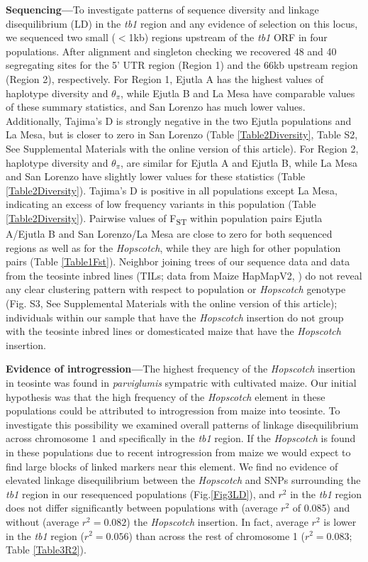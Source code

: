 \documentclass[11pt]{article} %
\begin{document}
\begin{linenumbers}
\begin{flushleft}
\textbf{Sequencing---}To investigate patterns of sequence diversity and linkage disequilibrium (LD) in the \emph{tb1} region and any evidence of selection on this locus, we sequenced two small ($<$1kb) regions upstream of the \emph{tb1} ORF in four populations. After alignment and singleton checking we recovered 48 and 40 segregating sites for the 5' UTR region (Region 1) and the 66kb upstream region (Region 2), respectively. For Region 1, Ejutla A has the highest values of haplotype diversity and $\theta_\pi$, while Ejutla B and La Mesa have comparable values of these summary statistics, and San Lorenzo has much lower values. Additionally, Tajima's D is strongly negative in the two Ejutla populations and La Mesa, but is closer to zero in San Lorenzo (Table \ref{Table2Diversity}, Table S2, See Supplemental Materials with the online version of this article). For Region 2, haplotype diversity and $\theta_\pi$, are similar for Ejutla A and Ejutla B, while La Mesa and San Lorenzo have slightly lower values for these statistics (Table \ref{Table2Diversity}). Tajima's D is positive in all populations except La Mesa, indicating an excess of low frequency variants in this population (Table \ref{Table2Diversity}). Pairwise values of F\textsubscript{ST} within population pairs Ejutla A/Ejutla B and San Lorenzo/La Mesa are close to zero for both sequenced regions as well as for the \emph{Hopscotch}, while they are high for other population pairs (Table \ref{Table1Fst}). Neighbor joining trees of our sequence data and data from the teosinte inbred lines (TILs; data from Maize HapMapV2, \citealt{Chia2012}) do not reveal any clear clustering pattern with respect to population or \emph{Hopscotch} genotype (Fig. S3, See Supplemental Materials with the online version of this article); individuals within our sample that have the \emph{Hopscotch} insertion do not group with the teosinte inbred lines or domesticated maize that have the \emph{Hopscotch} insertion. 

\textbf{Evidence of introgression---}The highest frequency of the \emph{Hopscotch} insertion in teosinte was found in \emph{parviglumis} sympatric with cultivated maize. Our initial hypothesis was that the high frequency of the \emph{Hopscotch} element in these populations could be attributed to introgression from maize into teosinte. To investigate this possibility we examined overall patterns of linkage disequilibrium across chromosome 1 and specifically in the \emph{tb1} region. If the \emph{Hopscotch} is found in these populations due to recent introgression from maize we would expect to find large blocks of linked markers near this element. We find no evidence of elevated linkage disequilibrium between the \emph{Hopscotch} and SNPs surrounding the \emph{tb1} region in our resequenced populations (Fig.\ref{Fig3LD}), and $r^{2}$ in the \emph{tb1} region  does not differ significantly between populations with (average $r^{2}$ of 0.085) and without (average $r^{2}=0.082$) the \emph{Hopscotch} insertion. In fact, average $r^{2}$ is lower in the \emph{tb1} region ($r^{2}=0.056$) than across the rest of chromosome 1 ($r^{2}=0.083$; Table \ref{Table3R2}).


\end{flushleft}
\end{linenumbers}
\end{document}
